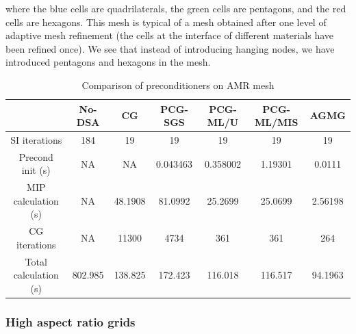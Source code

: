 where the blue cells are quadrilaterals, the green cells are pentagons, and
the red cells are hexagons. This mesh is typical of a mesh obtained after one 
level of adaptive mesh
refinement (the cells at the interface of different materials have been refined
once). We see that instead of introducing hanging nodes, we have introduced
pentagons and hexagons in the mesh.
\begin{table}[H]
  \caption{Comparison of preconditioners on AMR mesh}
  \begin{center}
    \begin{tabular}{|c|c|c|c|c|c|c|}
      \hline
       & No-DSA & CG & PCG-SGS & PCG-ML/U & PCG-ML/MIS & AGMG \\
      \hline
   SI iterations & 184     & 19      & 19       & 19      & 19       & 19 \\
Precond init (s) & NA      & NA      & 0.043463 & 0.358002 & 1.19301 & 0.0111\\
MIP calculation (s) & NA   & 48.1908 & 81.0992  & 25.2699 & 25.0699  & 
      2.56198\\
   CG iterations & NA      & 11300   & 4734     & 361     & 361      & 264 \\
     Total calculation (s) & 802.985 & 138.825 & 172.423  & 116.018 & 116.517  &
      94.1963\\
      \hline
    \end{tabular}
    \label{table_amr}
  \end{center}
\end{table}

\subsubsection{High aspect ratio grids}

